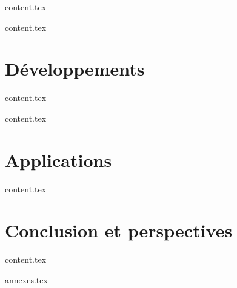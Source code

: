 \documentclass{bredele}
\begin{document}
\clearemptydoublepage
{content.tex}


\clearemptydoublepage
{content.tex}

\part{Développements}

\clearemptydoublepage
{content.tex}


\clearemptydoublepage
{content.tex}

\part{Applications}

\clearemptydoublepage
{content.tex}


\part{Conclusion et perspectives}


\clearemptydoublepage
{content.tex}



\frontmatter
\clearemptydoublepage
{annexes.tex}



\clearemptydoublepage
\backmatter
\printbibliography
\end{document}
